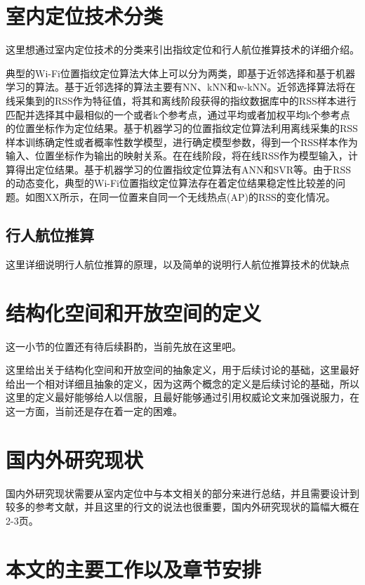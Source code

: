 \section{室内定位技术分类}

这里想通过室内定位技术的分类来引出指纹定位和行人航位推算技术的详细介绍。

典型的Wi-Fi位置指纹定位算法大体上可以分为两类，即基于近邻选择和基于机器学习的算法。基于近邻选择的算法主要有NN、kNN和w-kNN。近邻选择算法将在线采集到的RSS作为特征值，将其和离线阶段获得的指纹数据库中的RSS样本进行匹配并选择其中最相似的一个或者k个参考点，通过平均或者加权平均k个参考点的位置坐标作为定位结果。基于机器学习的位置指纹定位算法利用离线采集的RSS样本训练确定性或者概率性数学模型，进行确定模型参数，得到一个RSS样本作为输入、位置坐标作为输出的映射关系。在在线阶段，将在线RSS作为模型输入，计算得出定位结果。基于机器学习的位置指纹定位算法有ANN和SVR等。由于RSS的动态变化，典型的Wi-Fi位置指纹定位算法存在着定位结果稳定性比较差的问题。如图XX所示，在同一位置来自同一个无线热点(AP)的RSS的变化情况。

\subsection{行人航位推算}
这里详细说明行人航位推算的原理，以及简单的说明行人航位推算技术的优缺点




\section{结构化空间和开放空间的定义}

这一小节的位置还有待后续斟酌，当前先放在这里吧。

这里给出关于结构化空间和开放空间的抽象定义，用于后续讨论的基础，这里最好给出一个相对详细且抽象的定义，因为这两个概念的定义是后续讨论的基础，所以这里的定义最好能够给人以信服，且最好能够通过引用权威论文来加强说服力，在这一方面，当前还是存在着一定的困难。

\section{国内外研究现状}

国内外研究现状需要从室内定位中与本文相关的部分来进行总结，并且需要设计到较多的参考文献，并且这里的行文的说法也很重要，国内外研究现状的篇幅大概在2-3页。

\section{本文的主要工作以及章节安排}


